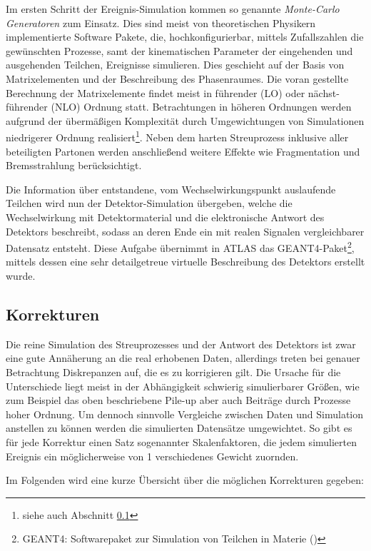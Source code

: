 Im ersten Schritt der Ereignis-Simulation kommen so genannte
\textit{Monte-Carlo Generatoren} zum Einsatz. Dies sind meist von theoretischen
Physikern implementierte Software Pakete, die, hochkonfigurierbar, mittels
Zufallszahlen die gewünschten Prozesse, samt der kinematischen Parameter der
eingehenden und ausgehenden Teilchen, Ereignisse simulieren. Dies geschieht auf
der Basis von Matrixelementen und der Beschreibung des Phasenraumes. Die voran
gestellte Berechnung der Matrixelemente findet meist in führender (LO) oder
nächst-führender (NLO) Ordnung statt. Betrachtungen in höheren Ordnungen werden
aufgrund der übermäßigen Komplexität durch Umgewichtungen von Simulationen
niedrigerer Ordnung realisiert\footnote{siehe auch Abschnitt
\ref{mc_corrections}}. Neben dem harten Streuprozess inklusive aller
beteiligten Partonen werden anschließend weitere Effekte wie Fragmentation und
Bremsstrahlung berücksichtigt.

Die Information über entstandene, vom Wechselwirkungspunkt auslaufende Teilchen
wird nun der Detektor-Simulation übergeben, welche die Wechselwirkung mit
Detektormaterial und die elektronische Antwort des Detektors beschreibt, sodass
an deren Ende ein mit realen Signalen vergleichbarer Datensatz entsteht. Diese
Aufgabe übernimmt in ATLAS das \textsc{GEANT4}-Paket\footnote{\textsc{GEANT4}:
Softwarepaket zur Simulation von Teilchen in Materie
(\cite{Agostinelli:2002hh})}, mittels dessen eine sehr detailgetreue virtuelle
Beschreibung des Detektors erstellt wurde.



\subsection{Korrekturen}
\label{mc_corrections}
Die reine Simulation des Streuprozesses und der Antwort des Detektors ist zwar
eine gute Annäherung an die real erhobenen Daten, allerdings treten bei genauer
Betrachtung Diskrepanzen auf, die es zu korrigieren gilt. Die Ursache für die
Unterschiede liegt meist in der Abhängigkeit schwierig simulierbarer Größen,
wie zum Beispiel das oben beschriebene Pile-up aber auch Beiträge durch 
Prozesse hoher Ordnung. Um dennoch sinnvolle Vergleiche zwischen Daten und
Simulation anstellen zu können werden die simulierten Datensätze umgewichtet.
So gibt es für jede Korrektur einen Satz sogenannter Skalenfaktoren, die jedem
simulierten Ereignis ein möglicherweise von 1 verschiedenes Gewicht zuornden.

Im Folgenden wird eine kurze Übersicht über die möglichen Korrekturen gegeben:

